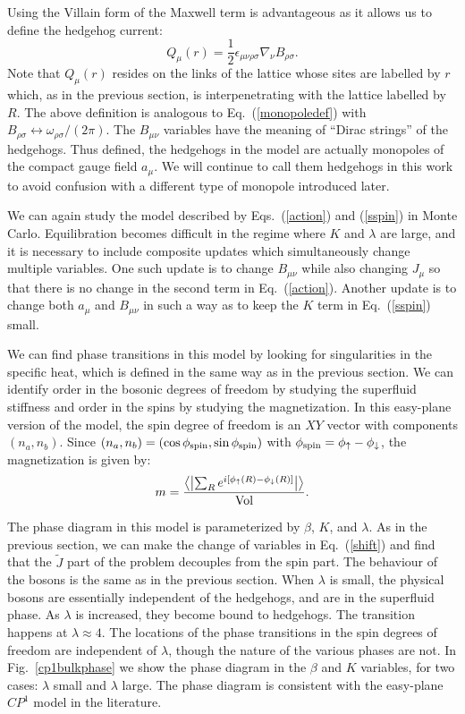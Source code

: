 Using the Villain form of the Maxwell term is advantageous as it allows us to define the hedgehog current:
\begin{equation}
Q_\mu(r)=\frac{1}{2}\epsilon_{\mu\nu\rho\sigma}\nabla_\nu B_{\rho\sigma}.
\label{mondef}
\end{equation}
Note that $Q_\mu(r)$ resides on the links of the lattice whose sites are labelled by $r$ which, as in the previous section, is interpenetrating with the lattice labelled by $R$. The above definition is analogous to Eq.~(\ref{monopoledef}) with $B_{\rho\sigma} \leftrightarrow \omega_{\rho\sigma}/(2\pi)$. The $B_{\mu\nu}$ variables have the meaning of ``Dirac strings'' of the hedgehogs. Thus defined, the hedgehogs in the \cp model are actually monopoles of the compact gauge field $a_\mu$. We will continue to call them hedgehogs in this work to avoid confusion with a different type of monopole introduced later. 

We can again study the model described by Eqs.~(\ref{action}) and (\ref{sspin}) in Monte Carlo. Equilibration becomes difficult in the regime where $K$ and $\lambda$ are large, and it is necessary to include composite updates which simultaneously change multiple variables. One such update is to change $B_{\mu\nu}$ while also changing $J_\mu$ so that there is no change in the second term in Eq.~(\ref{action}). Another update is to change both $a_\mu$ and $B_{\mu\nu}$ in such a way as to keep the $K$ term in Eq.~(\ref{sspin}) small. 

We can find phase transitions in this model by looking for singularities in the specific heat, which is defined in the same way as in the previous section. We can identify order in the bosonic degrees of freedom by studying the superfluid stiffness and order in the spins by studying the magnetization. In this easy-plane version of the model, the spin degree of freedom is an $XY$ vector with components $(n_a,n_b)$.  Since $(n_a, n_b) = (\cos\phi_{\rm spin}, \sin\phi_{\rm spin})$ with $\phi_{\rm spin} = \phi_\uparrow - \phi_\downarrow$, the magnetization is given by:
\begin{equation}
m = \frac{\left\langle\left|\sum_R e^{i [\phi_\uparrow(R) - \phi_\downarrow(R)]}\right|\right\rangle}{\rm Vol}. 
\label{cp1mag}
\end{equation}

The phase diagram in this model is parameterized by $\beta$, $K$, and $\lambda$. As in the previous section, we can make the change of variables in Eq.~(\ref{shift}) and find that the $\tilde{J}$ part of the problem decouples from the spin part. The behaviour of the bosons is the same as in the previous section. When $\lambda$ is small, the physical bosons are essentially independent of the hedgehogs, and are in the superfluid phase. As $\lambda$ is increased, they become bound to hedgehogs. The transition happens at $\lambda\approx 4$. 
The locations of the phase transitions in the spin degrees of freedom are independent of $\lambda$, though the nature of the various phases are not. In Fig.~\ref{cp1bulkphase} we show the phase diagram in the $\beta$ and $K$ variables, for two cases: $\lambda$ small and $\lambda$ large. The phase diagram is consistent with the easy-plane $CP^1$ model in the literature.\cite{artphoton} 

